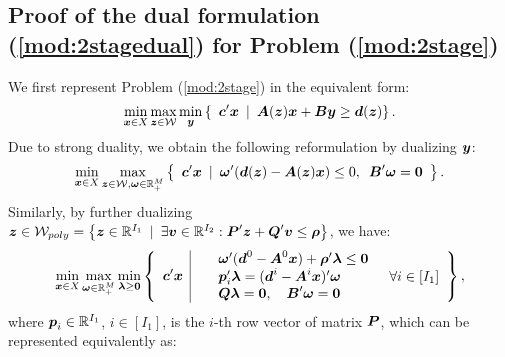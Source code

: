 \documentclass[fleqn,isre,blindrev]{informs4}
\newcommand{\mb}[1]{\mbox{\boldmath \ensuremath{#1}}}
\begin{document}
\begin{appendices}
	\section{Proof of the dual formulation (\ref{mod:2stagedual}) for  Problem (\ref{mod:2stage})  \label{proof:primaldual}} 
	We first represent Problem (\ref{mod:2stage}) in the equivalent form:
\begin{equation*}
		\min_{\boldsymbol{x} \in X} \max_{\boldsymbol{z} \in \mathcal{W}} \min_{\boldsymbol{y}}\left\{ \enskip \mb{c}'\mb{x} \enskip | \enskip  \mb{A}(\mb{z})\mb{x}+\mb{B}\mb{y} \geq\mb{d}(\mb{z}) \right\}.
\end{equation*}
	Due to strong duality, we obtain the following reformulation by dualizing $\mb{y}$:
\begin{equation*}
	\min_{\boldsymbol{x} \in X} \max_{\boldsymbol{z} \in \mathcal{W}, \boldsymbol{\omega} \in \mathbb{R}^{M}_+} \left\{ \enskip\mb{c}'\mb{x}  \enskip | \enskip  \mb{\omega}'(\mb{d}(\mb{z}) -\mb{A}(\mb{z})\mb{x}) \le 0, \enskip \mb{B}'\mb{\omega} =\mb{0} \enskip \right\}.
\end{equation*}
	Similarly, by further dualizing $\boldsymbol{z}\in \mathcal{W}_{poly} = \left\{\mb{z}\in \mathbb{R}^{I_1} \enskip |\enskip \exists \mb{v} \in \mathbb{R}^{I_2}: \mb{P}'\mb{z} + \mb{Q}'\mb{v} \le \mb{\rho} \right\}$, we have:
\begin{equation*}
	\min_{\boldsymbol{x} \in X} \max_{ \boldsymbol{\omega} \in \mathbb{R}^{M}_+} \min_{\boldsymbol{\lambda} \ge \boldsymbol{0}} \left\{ \enskip\mb{c}'\mb{x} \enskip \vline \enskip \begin{array}{lll}
	&  \mb{\omega}' (\mb{d}^0 -\mb{A}^0\mb{x}) + \mb{\rho}'\mb{\lambda} \le \mb{0} \\
	&\mb{p}_i'\mb{\lambda} = (\mb{d}^i- \mb{A}^i\mb{x})'\mb{\omega} &  \enskip \forall i\in [I_1]\\
	&\displaystyle  \mb{Q}\mb{\lambda} = \mb{0}, \quad  \mb{B}'\mb{\omega} =\mb{0} \\
	\end{array}
	\right\},
\end{equation*}
where $\mb{p}_i\in \mathbb{R}^{I_1}$, $i\in [I_1]$, is the $i$-th row vector of matrix $\mb{P}$, which can be represented equivalently as:


\end{appendices}
\end{document}
